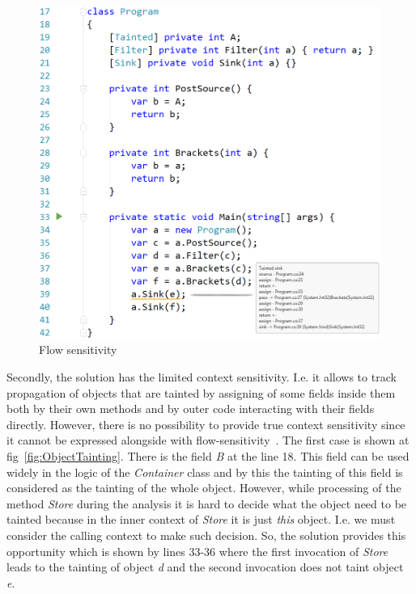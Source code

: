 \begin{figure}[h]
	\includegraphics[width=\linewidth]{screenshots/ReturnsAndBrackets.png}
	\caption{Flow sensitivity}
	\label{fig:ReturnsAndBrackets}
\end{figure}

Secondly, the solution has the limited context sensitivity. I.e. it allows to track propagation of objects that are tainted by assigning of some fields inside them both by their own methods and by outer code interacting with their fields directly.
However, there is no possibility to provide true context sensitivity since it cannot be expressed alongside with flow-sensitivity~\cite{Spath:2019:CFF:3302515.3290361}.
The first case is shown at fig~\ref{fig:ObjectTainting}.
There is the field \textit{B} at the line 18.
This field can be used widely in the logic of the \textit{Container} class and by this the tainting of this field is considered as the tainting of the whole object.
However, while processing of the method \textit{Store} during the analysis it is hard to decide what the object need to be tainted because in the inner context of \textit{Store} it is just \textit{this} object.
I.e. we must consider the calling context to make such decision.
So, the solution provides this opportunity which is shown by lines 33-36 where the first invocation of \textit{Store} leads to the tainting of object \textit{d} and the second invocation does not taint object \textit{e}.

